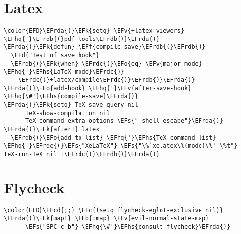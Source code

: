 \documentclass[12pt]{article}
\theoremstyle{plain}%
\theoremstyle{definition}
\theoremstyle{remark}
\newcommand{\EFc}[1]{\textcolor{EFc}{#1}} %
\newcommand{\EFcd}[1]{\textcolor{EFcd}{#1}} %
\newcommand{\EFs}[1]{\textcolor{EFs}{#1}} %
\newcommand{\EFd}[1]{\textcolor{EFd}{#1}} %
\newcommand{\EFk}[1]{\textcolor{EFk}{#1}} %
\newcommand{\EFb}[1]{\textcolor{EFb}{#1}} %
\newcommand{\EFf}[1]{\textcolor{EFf}{#1}} %
\newcommand{\EFv}[1]{\textcolor{EFv}{#1}} %
\newcommand{\EFo}[1]{\textcolor{EFo}{#1}} %
\newcommand{\EFhq}[1]{\textcolor{EFhq}{#1}} %
\newcommand{\EFhs}[1]{\textcolor{EFhs}{#1}} %
\newcommand{\EFrda}[1]{\textcolor{EFrda}{#1}} %
\newcommand{\EFrdb}[1]{\textcolor{EFrdb}{#1}} %
\newcommand{\EFrdc}[1]{\textcolor{EFrdc}{#1}} %
\begin{document}
\section{Latex}
\label{sec:orgd9072b6}
\begin{Code}
\begin{Verbatim}
\color{EFD}\EFrda{(}\EFk{setq} \EFv{+latex-viewers} \EFhq{'}\EFrdb{(}pdf-tools\EFrdb{)}\EFrda{)}
\EFrda{(}\EFk{defun} \EFf{compile-save}\EFrdb{(}\EFrdb{)}
  \EFd{"Test of save hook"}
  \EFrdb{(}\EFk{when} \EFrdc{(}\EFo{eq} \EFv{major-mode} \EFhq{'}\EFhs{LaTeX-mode}\EFrdc{)}
    \EFrdc{(}+latex/compile\EFrdc{)}\EFrdb{)}\EFrda{)}
\EFrda{(}\EFo{add-hook} \EFhq{'}\EFv{after-save-hook} \EFhq{\#'}\EFhs{compile-save}\EFrda{)}
\EFrda{(}\EFk{setq} TeX-save-query nil
      TeX-show-compilation nil
      TeX-command-extra-options \EFs{"-shell-escape"}\EFrda{)}
\EFrda{(}\EFk{after!} latex
  \EFrdb{(}\EFo{add-to-list} \EFhq{'}\EFhs{TeX-command-list} \EFhq{'}\EFrdc{(}\EFs{"XeLaTeX"} \EFs{"\%`xelatex\%(mode)\%' \%t"} TeX-run-TeX nil t\EFrdc{)}\EFrdb{)}\EFrda{)}
\end{Verbatim}
\end{Code}
\section{Flycheck}
\label{sec:orgbae4ecd}
\begin{Code}
\begin{Verbatim}
\color{EFD}\EFcd{;;} \EFc{(setq flycheck-eglot-exclusive nil)}
\EFrda{(}\EFk{map!} \EFb{:map} \EFv{evil-normal-state-map}
      \EFs{"SPC c b"} \EFhq{\#'}\EFhs{consult-flycheck}\EFrda{)}
\end{Verbatim}
\end{Code}
\end{document}
